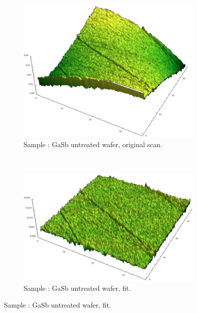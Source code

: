 \begin{figure}
    \begin{subfigure}{0.45\columnwidth}
         \includegraphics[width=\textwidth]{Bilder/s3_raw_orig.jpg}
         \caption{Sample : GaSb untreated wafer, original scan.}
        \label{s3_orig}
    \end{subfigure}
    ~
    \begin{subfigure}{0.45\columnwidth}
         \includegraphics[width=\textwidth]{Bilder/s3_raw_f.jpg}
         \caption{Sample : GaSb untreated wafer, fit.}
        \label{s3_flat}
    \end{subfigure}
     

\end{figure}
